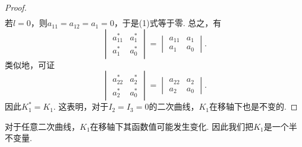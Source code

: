 \begin{theorem}
\begin{proof}
\begin{align*}
\end{align*}
若\(l = 0\)，则\(a_{11} = a_{12} = a_1 = 0\)，于是(1)式等于零.
总之，有\begin{equation*}
	\begin{vmatrix}
		a^*_{11} & a^*_1 \\
		a^*_1 & a^*_0
	\end{vmatrix}
	= \begin{vmatrix}
		a_{11} & a_1 \\
		a_1 & a_0
	\end{vmatrix}.
\end{equation*}
类似地，可证\begin{equation*}
	\begin{vmatrix}
		a^*_{22} & a^*_2 \\
		a^*_2 & a^*_0
	\end{vmatrix}
	= \begin{vmatrix}
		a_{22} & a_2 \\
		a_2 & a_0
	\end{vmatrix}.
\end{equation*}
因此\(K_1^* = K_1\).
这表明，对于\(I_2 = I_3 = 0\)的二次曲线，\(K_1\)在移轴下也是不变的.
\end{proof}
\end{theorem}
\begin{remark}
对于任意二次曲线，\(K_1\)在移轴下其函数值可能发生变化.
因此我们把\(K_1\)是一个半不变量.
\end{remark}

